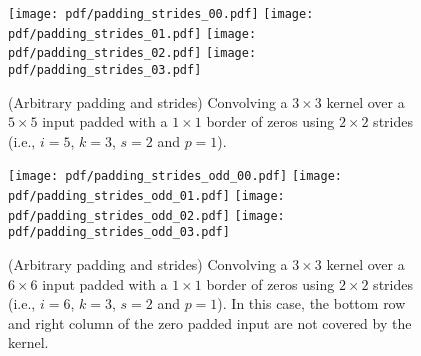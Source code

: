 \documentclass[notitlepage]{report}
\begin{document}
\begin{figure}[p]
    \centering
    \texttt{[image: pdf/padding\_strides\_00.pdf]}
    \texttt{[image: pdf/padding\_strides\_01.pdf]}
    \texttt{[image: pdf/padding\_strides\_02.pdf]}
    \texttt{[image: pdf/padding\_strides\_03.pdf]}
    \caption{\label{fig:padding_strides} (Arbitrary padding and strides)
        Convolving a $3 \times 3$ kernel over a $5 \times 5$ input padded with
        a $1 \times 1$ border of zeros using $2 \times 2$ strides (i.e.,
        $i = 5$, $k = 3$, $s = 2$ and $p = 1$).}
\end{figure}

\begin{figure}[p]
    \centering
    \texttt{[image: pdf/padding\_strides\_odd\_00.pdf]}
    \texttt{[image: pdf/padding\_strides\_odd\_01.pdf]}
    \texttt{[image: pdf/padding\_strides\_odd\_02.pdf]}
    \texttt{[image: pdf/padding\_strides\_odd\_03.pdf]}
    \caption{\label{fig:padding_strides_odd} (Arbitrary padding and strides)
        Convolving a $3 \times 3$ kernel over a $6 \times 6$ input padded with
        a $1 \times 1$ border of zeros using $2 \times 2$ strides (i.e.,
        $i = 6$, $k = 3$, $s = 2$ and $p = 1$). In this case, the bottom row
        and right column of the zero padded input are not covered by the
        kernel.}
\end{figure}
\end{document}
